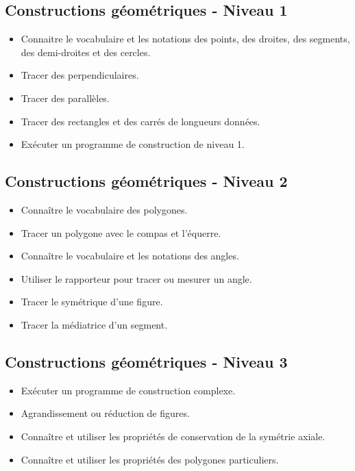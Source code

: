 \documentclass[a4paper,12pt,fleqn]{article}		
\begin{document}
\renewcommand{\labelitemi}{}

\subsection*{Constructions géométriques - Niveau 1}

\begin{itemize}
	\item {}Connaitre le vocabulaire et les notations des points, des droites, des segments, des demi-droites et des cercles. 
	\item {}Tracer des perpendiculaires.
	\item {}Tracer des parallèles.
	\item {}Tracer des rectangles et des carrés de longueurs données.
	\item {}Exécuter un programme de construction de niveau 1.
\end{itemize}

\subsection*{Constructions géométriques - Niveau 2}

\begin{itemize}
	\item {}Connaître le vocabulaire des polygones.
	\item {}Tracer un polygone avec le compas et l’équerre.
	\item {}Connaître le vocabulaire et les notations des angles.
	\item {}Utiliser le rapporteur pour tracer ou mesurer un angle.
	\item {}Tracer le symétrique d’une figure.
	\item {}Tracer la médiatrice d’un segment.
\end{itemize}

\subsection*{Constructions géométriques - Niveau 3}

\begin{itemize}
	\item {}Exécuter un programme de construction complexe.
	\item {}Agrandissement ou réduction de figures.
	\item {}Connaître et utiliser les propriétés de conservation de la symétrie axiale.
	\item {}Connaître et utiliser les propriétés des polygones particuliers.
\end{itemize}
	
\end{document}
